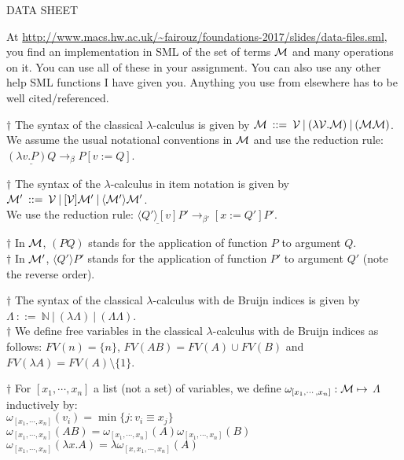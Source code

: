 \documentclass[11pt]{article}
\begin{document}
\begin{center}
\Huge{DATA SHEET}
\end{center}


At \url{http://www.macs.hw.ac.uk/~fairouz/foundations-2017/slides/data-files.sml}, you find an implementation in SML of the set of
terms ${\cal M}$ and many operations on it.  You can use all of these in your assignment.  You can also use any other help SML functions I have given you.  Anything you use from elsewhere has to be well cited/referenced.

$\dagger$ The syntax of the classical $\lambda$-calculus is given by
${\cal M}  \: ::=  \:  {\cal V} \:|\: ( \lambda{{\cal V}}.{{\cal M}}) \:|\: ( {\cal M} {\cal M})$.\\
We assume the usual notational conventions in ${\cal M}$ and use 
the reduction rule: \\$\underline{(\lambda v. P)Q} \rightarrow_\beta P[v:=Q]$.

$\dagger$ The syntax of the  $\lambda$-calculus in item notation is given by
${\cal M}'  \: ::=  \:  {\cal V} \:|\: [{\cal V}]{\cal M}' \:|\: \langle{\cal M}'\rangle{\cal M}'$.\\
We use the reduction rule: 
$ \underline{\langle Q'\rangle[v]}P' \rightarrow_{\beta'} [x:=Q']P'$.

$\dagger$ In ${\cal M}$, $(PQ)$ stands for the application of function $P$ to argument $Q$.\\
$\dagger$ In ${\cal M}'$, $\langle Q'\rangle P'$ stands for the application of function $P'$ to argument $Q'$ (note the reverse order).

$\dagger$ The syntax of the classical $\lambda$-calculus with de Bruijn indices is given by\\
$\Lambda  \: ::=  \:  {\mathbb{N}} \:|\: ( \lambda{}{\Lambda}) \:|\: ( \Lambda \Lambda)$.\\

$\dagger$ We define free variables in 
the classical $\lambda$-calculus with de Bruijn indices as follows:
$FV(n) = \{n\}$, $FV(AB) = FV(A)\cup FV(B)$ and $FV(\lambda A) = FV(A)\setminus\{1\}$.

$\dagger$  For $[x_1,\cdots, x_n]$ a list (not a set) of variables, 
we define $\omega_{[x_1,\cdots, x_n]}: {\cal M} \mapsto$ $\Lambda$ inductively by:\\
$\omega_{[x_1,\cdots, x_n]}(v_i) = \min\{j:v_i \equiv x_j\}$\\
$\omega_{[x_1,\cdots, x_n]}(AB) = \omega_{[x_1,\cdots, x_n]}(A)\omega_{[x_1,\cdots, x_n]}(B)$\\
$\omega_{[x_1,\cdots, x_n]}(\lambda x.A)= \lambda \omega_{[x,x_1,\cdots, x_n]}(A)$
\end{document}

